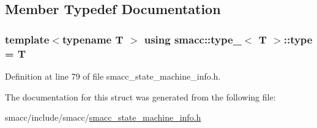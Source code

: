 \subsection{Member Typedef Documentation}
\subsubsection[{\texorpdfstring{type}{type}}]{\setlength{\rightskip}{0pt plus 5cm}template$<$typename T $>$ using {\bf smacc\+::type\+\_\+}$<$ T $>$\+::{\bf type} =  T}\hypertarget{structsmacc_1_1type___a9b8fcdd94d0e9fc71366e867a4094463}{}\label{structsmacc_1_1type___a9b8fcdd94d0e9fc71366e867a4094463}


Definition at line 79 of file smacc\+\_\+state\+\_\+machine\+\_\+info.\+h.



The documentation for this struct was generated from the following file\+:\begin{DoxyCompactItemize}
\item 
smacc/include/smacc/\hyperlink{smacc__state__machine__info_8h}{smacc\+\_\+state\+\_\+machine\+\_\+info.\+h}\end{DoxyCompactItemize}
